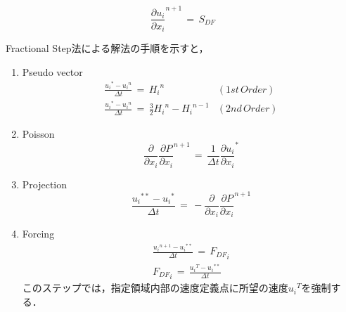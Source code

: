 \begin{equation}
{\frac{\partial u_{i}}{\partial x_{i}}}^{n+1} \, =\, S_{DF}
\label{Cont_IB_src ND}
\end{equation}

Fractional Step法による解法の手順を示すと，
\begin{enumerate}
\item Pseudo vector
\begin{equation}
\begin{array}{ll}
\displaystyle{ \frac{{u_{i}}^{*} - {u_{i}}^{n}}{\Delta t} \,=\, {H_{i}}^{n} } & (1st\,Order)\\
\displaystyle{ \frac{{u_{i}}^{*} - {u_{i}}^{n}}{\Delta t} \,=\, \frac{3}{2}{H_{i}}^{n} - {H_{i}}^{n-1} } & (2nd\,Order)
\end{array}
\label{DF pesudo}
\end{equation}

\item Poisson
\begin{equation}
\frac{\partial}{\partial x_{i}} {\frac{\partial P}{\partial x_{i}}}^{n+1} \,=\, 
\frac{1}{\Delta t} {\frac{\partial u_{i}}{\partial x_{i}}}^{*}
\label{DF Poisson}
\end{equation}

\item Projection
\begin{equation}
\frac{{u_{i}}^{**} - {u_{i}}^{*}}{\Delta t} \,=\, - \frac{\partial}{\partial x_{i}} {\frac{\partial P}{\partial x_{i}}}^{n+1}
\label{DF Projection}
\end{equation}

\item Forcing
\begin{equation}
\begin{array}{l}
\displaystyle{ \frac{{u_{i}}^{n+1} - {u_{i}}^{**}}{\Delta t} \,=\, {F_{DF}}_{i} }\\
\displaystyle{ {F_{DF}}_{i} \,=\, \frac{{u_{i}}^{T} - {u_{i}}^{**}}{\Delta t} }
\end{array}
\label{DF forcing}
\end{equation}
このステップでは，指定領域内部の速度定義点に所望の速度${u_{i}}^{T}$を強制する．

\end{enumerate}

